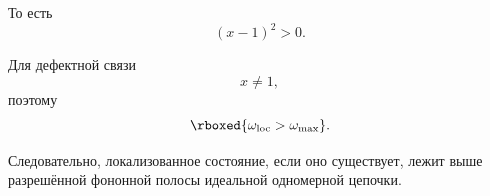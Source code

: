 \documentclass[../final.tex]{subfiles}
\begin{document}
То есть
%
\begin{equation*}
    (x-1)^2>0.
\end{equation*}

Для дефектной связи
%
\begin{equation*}
    x\neq1,
\end{equation*}
%
поэтому
%
\begin{equation*}
    \rboxed{
        \omega_{\mathrm{loc}}
        >
        \omega_{\max}
    }.
\end{equation*}

Следовательно, локализованное состояние,
если оно существует, лежит выше разрешённой фононной полосы
идеальной одномерной цепочки.
\end{document}
